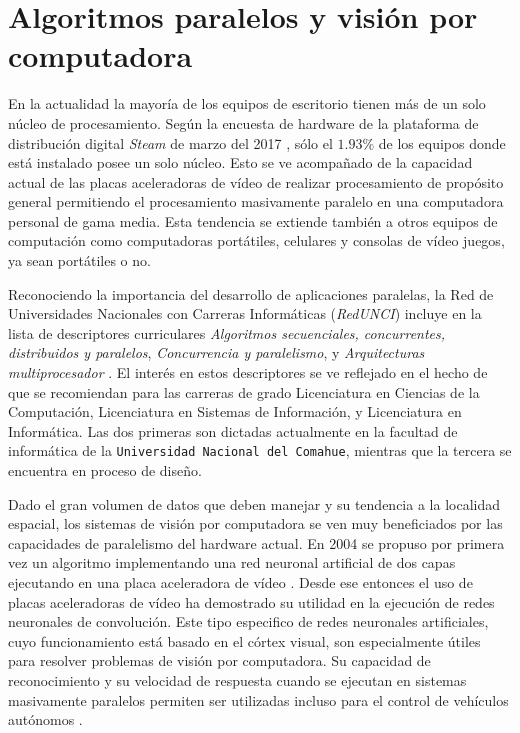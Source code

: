 
\section{Algoritmos paralelos y visión por computadora}

\label{algoritmosParalelosYVision}

En la actualidad la mayoría de los equipos de escritorio tienen más de un solo
núcleo de procesamiento. Según la encuesta de hardware de la plataforma de
distribución digital \emph{Steam} de marzo del 2017 \cite{steamSurvey}, sólo
el $1.93$\% de los equipos donde está instalado posee un solo núcleo. Esto se
ve acompañado de la capacidad actual de las placas aceleradoras de vídeo de
realizar procesamiento de propósito general permitiendo el procesamiento
masivamente paralelo en una computadora personal de gama media. Esta tendencia
se extiende también a otros equipos de computación como computadoras
portátiles, celulares y consolas de vídeo juegos, ya sean portátiles o no.

Reconociendo la importancia del desarrollo de aplicaciones paralelas, la Red
de Universidades Nacionales con Carreras Informáticas (\emph{RedUNCI}) incluye
en la lista de descriptores curriculares \emph{Algoritmos secuenciales,
concurrentes, distribuidos y paralelos}, \emph{Concurrencia y paralelismo}, y
\emph{Arquitecturas multiprocesador} \cite{RedUNCI2015}. El interés en estos
descriptores se ve reflejado en el hecho de que se recomiendan para las
carreras de grado Licenciatura en Ciencias de la Computación, Licenciatura en
Sistemas de Información, y Licenciatura en Informática. Las dos primeras son
dictadas actualmente en la facultad de informática de la \texttt{Universidad
Nacional del Comahue}, mientras que la tercera se encuentra en proceso de
diseño.

Dado el gran volumen de datos que deben manejar y su tendencia a la localidad
espacial, los sistemas de visión por computadora se ven muy beneficiados por
las capacidades de paralelismo del hardware actual. En 2004 se propuso por
primera vez un algoritmo implementando una red neuronal artificial de dos
capas ejecutando en una placa aceleradora de vídeo \cite{GPUforMLA}. Desde ese
entonces el uso de placas aceleradoras de vídeo ha demostrado su utilidad en la
ejecución de redes neuronales de convolución. Este tipo especifico de redes
neuronales artificiales, cuyo funcionamiento está basado en el córtex visual,
son especialmente útiles para resolver problemas de visión por computadora. Su
capacidad de reconocimiento y su velocidad de respuesta cuando se ejecutan en
sistemas masivamente paralelos permiten ser utilizadas incluso para el control
de vehículos autónomos \cite{e2eLearning4SDC}.

